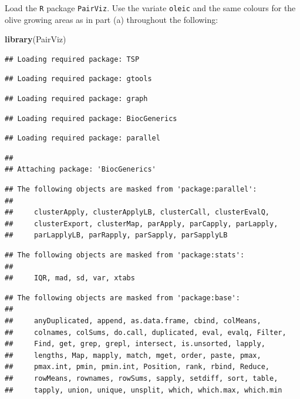 \documentclass[9pt,letter]{article}
\newenvironment{Shaded}{\begin{snugshade}}{\end{snugshade}}
\newcommand{\KeywordTok}[1]{\textcolor[rgb]{0.13,0.29,0.53}{\textbf{#1}}}
\newcommand{\NormalTok}[1]{#1}
\begin{document}
\item 

Load the \texttt{R} package \texttt{PairViz}. Use the variate
\texttt{oleic} and the same colours for the olive growing areas as in
part (a) throughout the following:

\begin{Shaded}
\begin{Highlighting}[]
\KeywordTok{library}\NormalTok{(PairViz)}
\end{Highlighting}
\end{Shaded}

\begin{verbatim}
## Loading required package: TSP
\end{verbatim}

\begin{verbatim}
## Loading required package: gtools
\end{verbatim}

\begin{verbatim}
## Loading required package: graph
\end{verbatim}

\begin{verbatim}
## Loading required package: BiocGenerics
\end{verbatim}

\begin{verbatim}
## Loading required package: parallel
\end{verbatim}

\begin{verbatim}
## 
## Attaching package: 'BiocGenerics'
\end{verbatim}

\begin{verbatim}
## The following objects are masked from 'package:parallel':
## 
##     clusterApply, clusterApplyLB, clusterCall, clusterEvalQ,
##     clusterExport, clusterMap, parApply, parCapply, parLapply,
##     parLapplyLB, parRapply, parSapply, parSapplyLB
\end{verbatim}

\begin{verbatim}
## The following objects are masked from 'package:stats':
## 
##     IQR, mad, sd, var, xtabs
\end{verbatim}

\begin{verbatim}
## The following objects are masked from 'package:base':
## 
##     anyDuplicated, append, as.data.frame, cbind, colMeans,
##     colnames, colSums, do.call, duplicated, eval, evalq, Filter,
##     Find, get, grep, grepl, intersect, is.unsorted, lapply,
##     lengths, Map, mapply, match, mget, order, paste, pmax,
##     pmax.int, pmin, pmin.int, Position, rank, rbind, Reduce,
##     rowMeans, rownames, rowSums, sapply, setdiff, sort, table,
##     tapply, union, unique, unsplit, which, which.max, which.min
\end{verbatim}
\end{document}
